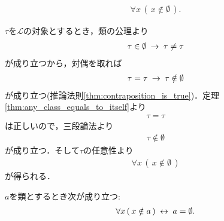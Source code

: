 	\begin{screen}
		\begin{thm}\label{thm:emptyset_has_nothing}
			\begin{align}
				\forall x\, (\, x \notin \emptyset\, ).
			\end{align}
		\end{thm}
	\end{screen}
	
	\begin{sketch}
		$\tau$を$\mathscr{L}$の対象とするとき，類の公理より
		\begin{align}
			\tau \in \emptyset \hspace{0.25em}\rightarrow\hspace{0.25em} \tau \neq \tau
		\end{align}
		が成り立つから，対偶を取れば
		\begin{align}
			\tau = \tau \hspace{0.25em}\rightarrow\hspace{0.25em} \tau \notin \emptyset
		\end{align}
		が成り立つ(推論法則\ref{thm:contraposition_is_true})．定理\ref{thm:any_class_equals_to_itself}より
		\begin{align}
			\tau = \tau
		\end{align}
		は正しいので，三段論法より
		\begin{align}
			\tau \notin \emptyset
		\end{align}
		が成り立つ．そして$\tau$の任意性より
		\begin{align}
			\forall x\, (\, x \notin \emptyset\, )
		\end{align}
		が得られる．
		\QED
	\end{sketch}
	
	\begin{screen}
		\begin{thm}
		\label{thm:uniqueness_of_emptyset}
			$a$を類とするとき次が成り立つ:
			\begin{align}
				\forall x\, (\, x \notin a\, ) \hspace{0.25em}\leftrightarrow\hspace{0.25em} a = \emptyset.
			\end{align}
		\end{thm}
	\end{screen}
	
